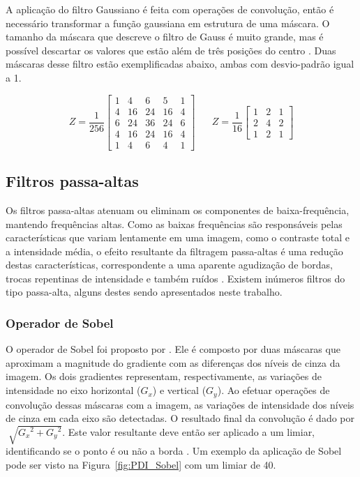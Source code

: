 \documentclass[12pt,oneside,a4paper,english,french,spanish,brazil,]{abntex2}
\begin{document}
A aplicação do filtro Gaussiano é feita com operações de convolução, então é necessário transformar a função gaussiana em estrutura de uma máscara. O tamanho da máscara que descreve o filtro de Gauss é muito grande, mas é possível descartar os valores que estão além de três posições do centro \cite{conci:2003}. Duas máscaras desse filtro estão exemplificadas abaixo, ambas com desvio-padrão igual a 1.

\[Z=\frac{1}{256}\begin{bmatrix}
1 & 4 & 6 & 5 & 1\\ 
4 & 16 & 24 & 16 & 4\\ 
6 & 24 & 36 & 24 & 6\\ 
4 & 16 & 24 & 16 & 4\\ 
1 & 4 & 6 & 4 & 1
\end{bmatrix}
\; \; \; \; \; \; 
Z=\frac{1}{16}\begin{bmatrix}
1 & 2 & 1\\ 
2 & 4 & 2\\ 
1 & 2 & 1
\end{bmatrix}
\]

\subsection{Filtros passa-altas}

Os filtros passa-altas atenuam ou eliminam os componentes de baixa-frequência, mantendo frequências altas. Como as baixas frequências são responsáveis pelas características que variam lentamente em uma imagem, como o contraste total e a intensidade média, o efeito resultante da filtragem passa-altas é uma redução destas características, correspondente a uma aparente agudização de bordas, trocas repentinas de intensidade e também ruídos \cite{gonzalez:2012}. Existem inúmeros filtros do tipo passa-alta, alguns destes sendo apresentados neste trabalho.

\subsubsection{Operador de Sobel}

O operador de Sobel foi proposto por \citet{sobel:1968}. Ele é composto por duas máscaras que aproximam a magnitude do gradiente com as diferenças dos níveis de cinza da imagem. Os dois gradientes representam, respectivamente, as variações de intensidade no eixo horizontal (\(G_x\)) e vertical (\(G_y\)). Ao efetuar operações de convolução dessas máscaras com a imagem, as variações de intensidade dos níveis de cinza em cada eixo são detectadas. O resultado final da convolução é dado por \(\sqrt[]{{G_x}^2 + {G_y}^2}\). Este valor resultante deve então ser aplicado a um limiar, identificando se o ponto é ou não a borda \cite{pedrini:2008}. Um exemplo da aplicação de Sobel pode ser visto na Figura~\ref{fig:PDI_Sobel} com um limiar de 40.
\end{document}
